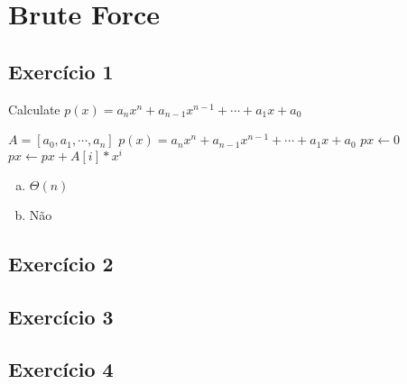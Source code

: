\section{Brute Force}\label{sec:brute_force}

\subsection{Exercício 1}\label{sec:exer1}

\begin{algorithm}
  \caption{Calculate $p(x) = a_{n}x{^n}+a_{n-1}x^{n-1}+\cdots+a_{1}x+a_{0}$}
  \begin{algorithmic}
    \REQUIRE $A=[a_{0}, a_{1}, \cdots, a_{n}]$
    \ENSURE $p(x) = a_{n}x{^n}+a_{n-1}x^{n-1}+\cdots+a_{1}x+a_{0}$
    \STATE $px \leftarrow 0$
      \STATE $px \leftarrow px + A[i]*x^{i}$
    \ENDFOR
  \end{algorithmic}
\end{algorithm}

\begin{enumerate}[a)]
  \item $\Theta(n)$
  \item Não
\end{enumerate}

\subsection{Exercício 2}\label{sec:exer2}

\subsection{Exercício 3}\label{sec:exer3}

\subsection{Exercício 4}\label{sec:exer4}
